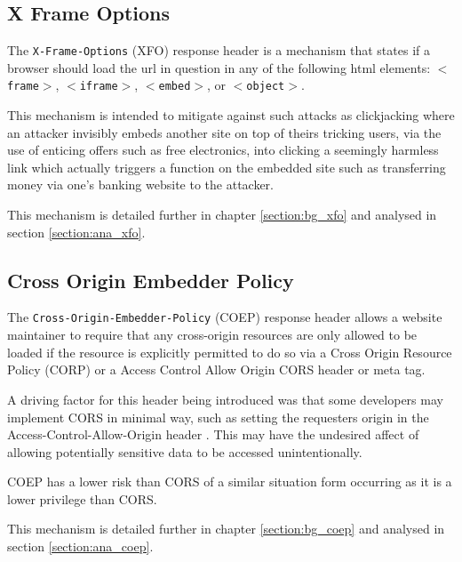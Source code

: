 \documentclass{mscreport}
\begin{document}
\subsection{X Frame Options}
The \texttt{X-Frame-Options} (XFO) response header is a mechanism that states if a browser should load the url in question in any of the following html elements: \texttt{$<$frame$>$}, \texttt{$<$iframe$>$}, \texttt{$<$embed$>$}, or \texttt{$<$object$>$}.

\vspace{0.3cm} \noindent
This mechanism is intended to mitigate against such attacks as clickjacking where an attacker invisibly embeds another site on top of theirs tricking users, via the use of enticing offers such as free electronics, into clicking a seemingly harmless link which actually triggers a function on the embedded site such as transferring money via one's banking website to the attacker.

\vspace{0.3cm} \noindent
This mechanism is detailed further in chapter \ref{section:bg_xfo} and analysed in section \ref{section:ana_xfo}.


\subsection{Cross Origin Embedder Policy}
The \texttt{Cross-Origin-Embedder-Policy} (COEP) response header allows a website maintainer to require that any cross-origin resources are only allowed to be loaded if the resource is explicitly permitted to do so via a Cross Origin Resource Policy (CORP) or a Access Control Allow Origin CORS header or meta tag.

\vspace{0.3cm} \noindent
A driving factor for this header being introduced was that some developers may implement CORS in minimal way, such as setting the requesters origin in the Access-Control-Allow-Origin header \cite{noauthor_undated-cr}. This may have the undesired affect of allowing potentially sensitive data to be accessed unintentionally.

\vspace{0.3cm} \noindent
COEP has a lower risk than CORS of a similar situation form occurring as it is a lower privilege than CORS.

\vspace{0.3cm} \noindent
This mechanism is detailed further in chapter \ref{section:bg_coep} and analysed in section \ref{section:ana_coep}.
\end{document}
